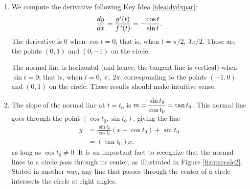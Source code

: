 		{\begin{enumerate}
			\item We compute the derivative following Key Idea \ref{idea:dydxpar}:
			$$\frac{dy}{dx} = \frac{g\hskip.75pt'(t)}{f\,'(t)} = -\frac{\cos t}{\sin t}.$$
			The derivative is $0$ when $\cos t= 0$; that is, when $t=\pi/2,\ 3\pi/2$. These are the points $(0,1)$ and $(0,-1)$ on the circle.
			
			The normal line is horizontal (and hence, the tangent line is vertical) when $\sin t=0$; that is, when $t= 0,\ \pi,\ 2\pi$, corresponding to the points $(-1,0)$ and $(0,1)$ on the circle. These results should make intuitive sense.
			\item		The slope of the normal line at $t=t_0$ is $\displaystyle m=\frac{\sin t_0}{\cos t_0} = \tan t_0$. This normal line goes through the point $(\cos t_0,\sin t_0)$, giving the line \begin{align*}y &=\frac{\sin t_0}{\cos t_0}(x-\cos t_0) + \sin t_0\\	
							&= (\tan t_0)x,
\end{align*}
as long as $\cos t_0\neq 0$. It is an important fact to recognize that the normal lines to a circle pass through its center, as illustrated in Figure \ref{fig:parcalc2}. Stated in another way, any line that passes through the center of a circle intersects the circle at right angles.
		\end{enumerate}
	\baselineskip
		}\\

\clearpage

